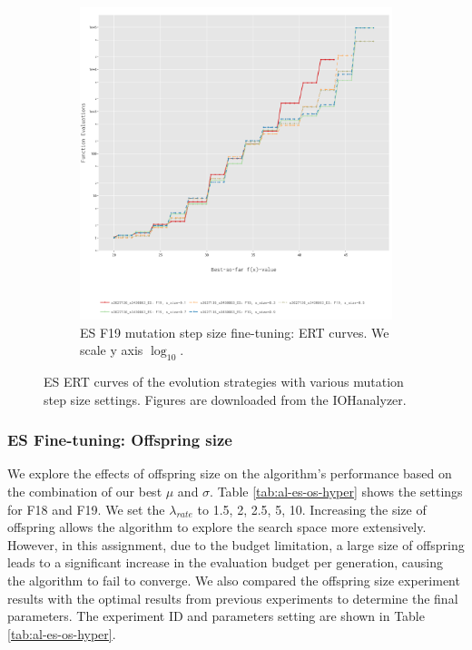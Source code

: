 \documentclass{article}
\begin{document}
\begin{figure}[!ht]
\begin{subfigure}[h]{0.95\linewidth}
        \includegraphics[width=\linewidth]{es/f19/ERT19ss.png}
        \caption{ES F19 mutation step size fine-tuning: ERT curves. We scale y axis $\log_{10}$.}
    \end{subfigure}
    \caption{ES ERT curves of the evolution strategies with various mutation step size settings. Figures are downloaded from the IOHanalyzer.}
    \label{fig:experi-es-ssize-ert}
\end{figure}

\subsubsection{ES Fine-tuning: Offspring size}

We explore the effects of offspring size on the algorithm's performance based on the combination of our best $\mu$ and $\sigma$. Table \ref{tab:al-es-os-hyper} shows the settings for F18 and F19. We set the $\lambda_{rate}$ to 1.5, 2, 2.5, 5, 10. Increasing the size of offspring allows the algorithm to explore the search space more extensively. However, in this assignment, due to the budget limitation, a large size of offspring leads to a significant increase in the evaluation budget per generation, causing the algorithm to fail to converge. We also compared the offspring size experiment results with the optimal results from previous experiments to determine the final parameters. The experiment ID and parameters setting are shown in Table \ref{tab:al-es-os-hyper}.
\end{document}
